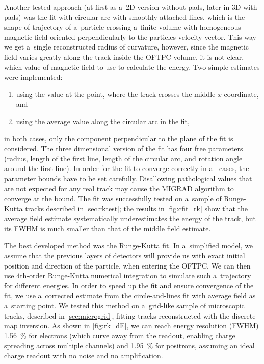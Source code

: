 		Another tested approach (at first as a~2D version without pads, later in 3D with pads) was the fit with circular arc with smoothly attached lines, which is the shape of trajectory of a~particle crossing a~finite volume with homogeneous magnetic field oriented perpendicularly to the particles velocity vector. This way we get a~single reconstructed radius of curvature, however, since the magnetic field varies greatly along the track inside the \ac{OFTPC} volume, it is not clear, which value of magnetic field to use to calculate the energy. Two simple estimates were implemented:
		\begin{enumerate}[nosep]
			\item using the value at the point, where the track crosses the middle $x$\nobreakdash-coordinate, and
			\item using the average value along the circular arc in the fit,
		\end{enumerate}
		in both cases, only the component perpendicular to the plane of the fit is considered. The three dimensional version of the fit has four free parameters (radius, length of the first line, length of the circular arc, and rotation angle around the first line). In order for the fit to converge correctly in all cases, the parameter bounds have to be set carefully. Disallowing pathological values that are not expected for any real track may cause the MIGRAD algorithm to converge at the bound. The fit was successfully tested on a~sample of Runge-Kutta tracks described in \cref{sec:rktest}; the results in \cref{fig:cfit_rk} show that the average field estimate systematically underestimates the energy of the track, but its \acs{FWHM} is much smaller than that of the middle field estimate.
		
		The best developed method was the Runge-Kutta fit. In a~simplified model, we assume that the previous layers of detectors will provide us with exact initial position and direction of the particle, when entering the \ac{OFTPC}. We can then use 4th\nobreakdash-order Runge-Kutta numerical integration to simulate such a~trajectory for different energies. In order to speed up the fit and ensure convergence of the fit, we use a~corrected estimate from the circle-and-lines fit with average field as a~starting point. We tested this method on a~grid-like sample of microscopic tracks, described in \cref{sec:microgrid}, fitting tracks reconstructed with the discrete map inversion. As shown in \cref{fig:rk_dE}, we can reach energy resolution (\acs{FWHM}) \qty{1.56}{\percent} for electrons (which curve away from the readout, enabling charge spreading across multiple channels) and \qty{1.95}{\percent} for positrons, assuming an ideal charge readout with no noise and no amplification.
		
